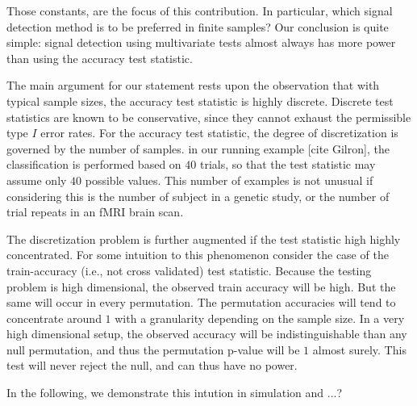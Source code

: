 \documentclass{pnastwo}
\begin{document}
\begin{article}
Those constants, are the focus of this contribution. In particular, which signal detection method is to be preferred in finite samples? 
Our conclusion is quite simple: signal detection using multivariate tests almost always has more power than using the accuracy test statistic.

The main argument for our statement rests upon the observation that with typical sample sizes, the accuracy test statistic is highly discrete. 
Discrete test statistics are known to be conservative, since they cannot exhaust the permissible type $I$ error rates. 
For the accuracy test statistic, the degree of discretization is governed by the number of samples. 
in our running example [cite Gilron], the classification is performed based on $40$ trials, so that the test statistic may assume only $40$ possible values. 
This number of examples is not unusual if considering this is the number of subject in a genetic study, or the number of trial repeats in an fMRI brain scan. 

The discretization problem is further augmented if the test statistic high highly concentrated. 
For some intuition to this phenomenon consider the case of the train-accuracy (i.e., not cross validated) test statistic.
Because the testing problem is high dimensional, the observed train accuracy will be high. But the same will occur in every permutation. The permutation accuracies will tend to concentrate around $1$ with a granularity depending on the sample size. 
In a very high dimensional setup, the observed accuracy will be indistinguishable than any null permutation, and thus the permutation p-value will be $1$ almost surely. 
This test will never reject the null, and can thus have no power. 

In the following, we demonstrate this intution in simulation and ...?
























%

\end{article}
\end{document}
